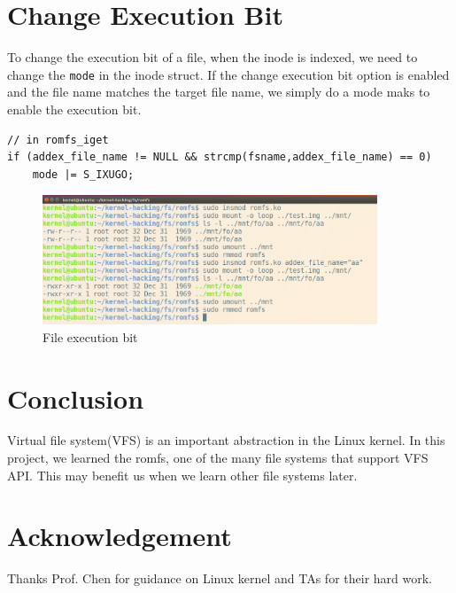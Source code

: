 \documentclass{article}
\begin{document}
\section{Change Execution Bit}
To change the execution bit of a file, when the inode is indexed, we need to change the \verb|mode| in the inode struct. If the change execution bit option is enabled and the file name matches the target file name, we simply do a mode maks to enable the execution bit.

\begin{lstlisting}[caption=Code for encryption]
// in romfs_iget
if (addex_file_name != NULL && strcmp(fsname,addex_file_name) == 0)
	mode |= S_IXUGO;
\end{lstlisting}

\begin{figure}[H]
\centering
\includegraphics[width=10cm]{exec.png}
\caption{File execution bit}
\end{figure}


\section{Conclusion}
Virtual file system(VFS) is an important abstraction in the Linux kernel. In this project, we learned the romfs, one of the many file systems that support VFS API. This may benefit us when we learn other file systems later.

\section*{Acknowledgement}
Thanks Prof. Chen for guidance on Linux kernel and TAs for their hard work.
\end{document}
